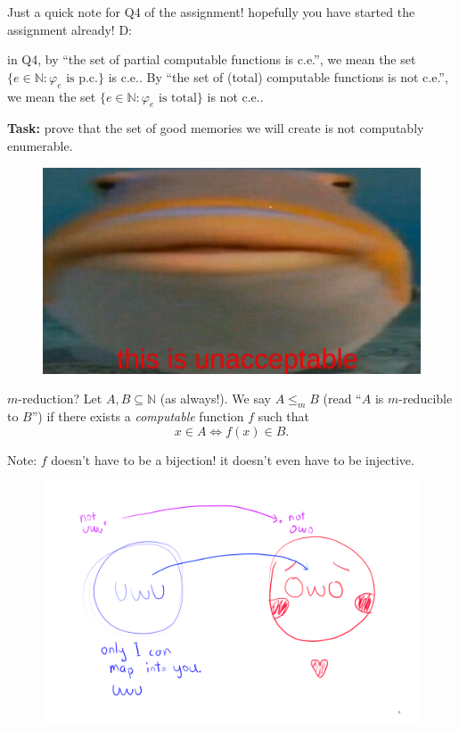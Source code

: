 \documentclass{beamer}
\begin{document}
\begin{frame}{Just a quick note for Q4 of the assignment!}
hopefully you have started the assignment already! D:

\vspace{2mm}

in Q4, by ``the set of partial computable functions is c.e.'', we mean the set
$\{e \in \mathbb N: \text{$\varphi_e$ is p.c.}\}$ is c.e.. By ``the set of (total) computable functions is not c.e.'', we mean the set $\{e \in \mathbb N: \text{$\varphi_e$ is total}\}$ is not c.e..

\vspace{2mm}

{\color{red} \textbf{Task:} prove that the set of good memories we will create is not computably enumerable. \emojiflushed}

\begin{figure}[h]
\centering
\includegraphics[scale=0.2]{img/helo_fish_unacceptable.jpg}
\end{figure}
\end{frame}

\begin{frame}{$m$-reduction? \emojiflushed}
Let $A, B \subseteq \mathbb N$ (as always!). We say $A \leq_m B$ (read ``$A$ is $m$-reducible to $B$'') if there exists a \textit{computable} function $f$ such that
$$x \in A \Leftrightarrow f(x) \in B.$$ 

Note: $f$ doesn't have to be a bijection! it doesn't even have to be injective.

\begin{figure}[h]
\centering
\includegraphics[scale=0.23]{img/uwu_owo.png}
\end{figure}

\end{frame}
\end{document}

